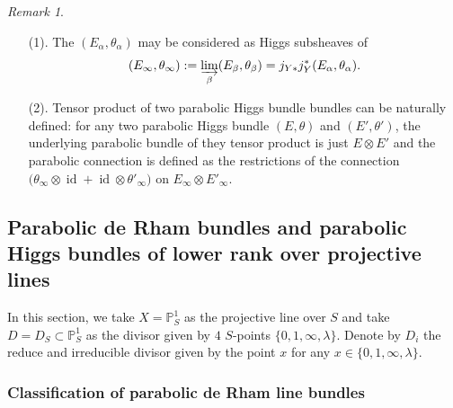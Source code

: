 \documentclass[12pt,twoside]{book}
\theoremstyle{plain}
\theoremstyle{definition}
\theoremstyle{remark}
\newtheorem{remark}[remark]{Remark}
\newcommand{\bP}{{\mathbb P}}
\DeclareMathOperator\id{id}
\numberwithin{equation}{section}
\begin{document}
\begin{remark}
\begin{enumerate}
\item[(1).] The $(E_\alpha,\theta_\alpha)$ may be considered as Higgs subsheaves of
\[(E_\infty,\theta_\infty) := \varinjlim_\beta (E_\beta,\theta_\beta) = j_{Y*}j^*_Y (E_\alpha,\theta_\alpha).\]
\item[(2).] Tensor product of two parabolic Higgs bundle bundles can be naturally defined: for any two parabolic Higgs bundle $(E,\theta)$ and $(E',\theta')$, the underlying parabolic bundle of they tensor product is just $E\otimes E'$ and the parabolic connection is defined as the restrictions of the connection $\Big(\theta_\infty\otimes \id + \id\otimes \theta'_\infty\Big)$ on $E_\infty\otimes E'_\infty$.
\end{enumerate}
\end{remark}


\subsection{Parabolic de Rham bundles and parabolic Higgs bundles of lower rank over projective lines} \label{sec_para_classification_lower_rank}

In this section, we take $X=\bP^1_S$ as the projective line over $S$ and take $D=D_S\subset \bP_S^1$ as the divisor given by $4$ $S$-points $\{0,1,\infty,\lambda\}$. Denote by $D_i$ the reduce and irreducible divisor given by the point $x$ for any $x\in\{0,1,\infty,\lambda\}$.

\subsubsection{Classification of parabolic de Rham line bundles}
\end{document}
